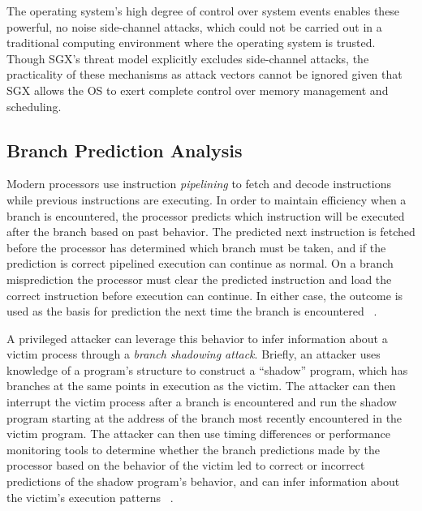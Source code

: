 The operating system's high degree of control over system events enables these powerful, no noise side-channel attacks, which could not be carried out in a traditional computing environment where the operating system is trusted. Though SGX's threat model explicitly excludes side-channel attacks, the practicality of these mechanisms as attack vectors cannot be ignored given that SGX allows the OS to exert complete control over memory management and scheduling.

\subsection{Branch Prediction Analysis}

Modern processors use instruction \emph{pipelining} to fetch and decode instructions while previous instructions are executing. In order to maintain efficiency when a branch is encountered, the processor predicts which instruction will be executed after the branch based on past behavior. The predicted next instruction is fetched before the processor has determined which branch must be taken, and if the prediction is correct pipelined execution can continue as normal. On a branch misprediction the processor must clear the predicted instruction and load the correct instruction before execution can continue. In either case, the outcome is used as the basis for prediction the next time the branch is encountered ~\cite{aciicmez_power_2007, lee_inferring_2017}. 

A privileged attacker can leverage this behavior to infer information about a victim process through a \emph{branch shadowing attack}. Briefly, an attacker uses knowledge of a program's structure to construct a ``shadow'' program, which has branches at the same points in execution as the victim. The attacker can then interrupt the victim process after a branch is encountered and run the shadow program starting at the address of the branch most recently encountered in the victim program. The attacker can then use timing differences or performance monitoring tools to determine whether the branch predictions made by the processor based on the behavior of the victim led to correct or incorrect predictions of the shadow program's behavior, and can infer information about the victim's execution patterns ~\cite{lee_inferring_2017}.

